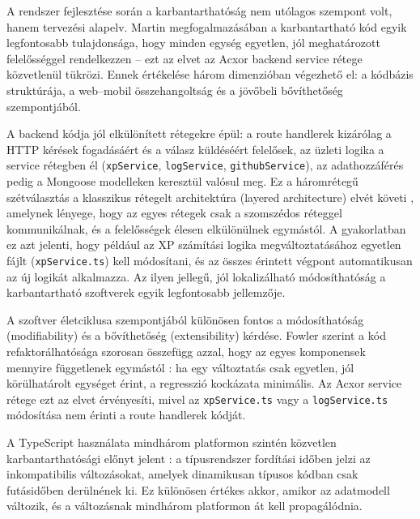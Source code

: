 
A rendszer fejlesztése során a karbantarthatóság nem utólagos szempont volt, hanem tervezési alapelv. Martin megfogalmazásában a karbantartható kód egyik legfontosabb tulajdonsága, hogy minden egység egyetlen, jól meghatározott felelősséggel rendelkezzen \cite{martin2008clean} -- ezt az elvet az Acxor backend service rétege közvetlenül tükrözi. Ennek értékelése három dimenzióban végezhető el: a kódbázis struktúrája, a web--mobil összehangoltság és a jövőbeli bővíthetőség szempontjából.


A backend kódja jól elkülönített rétegekre épül: a route handlerek kizárólag a HTTP kérések fogadásáért és a válasz küldéséért felelősek, az üzleti logika a service rétegben él (\texttt{xpService}, \texttt{logService}, \texttt{githubService}), az adathozzáférés pedig a Mongoose modelleken keresztül valósul meg. Ez a háromrétegű szétválasztás a klasszikus rétegelt architektúra (layered architecture) elvét követi \cite{gamma1994design}, amelynek lényege, hogy az egyes rétegek csak a szomszédos réteggel kommunikálnak, és a felelősségek élesen elkülönülnek egymástól. A gyakorlatban ez azt jelenti, hogy például az XP számítási logika megváltoztatásához egyetlen fájlt (\texttt{xpService.ts}) kell módosítani, és az összes érintett végpont automatikusan az új logikát alkalmazza. Az ilyen jellegű, jól lokalizálható módosíthatóság a karbantartható szoftverek egyik legfontosabb jellemzője.

A szoftver életciklusa szempontjából különösen fontos a módosíthatóság (modifiability) és a bővíthetőség (extensibility) kérdése. Fowler szerint a kód refaktorálhatósága szorosan összefügg azzal, hogy az egyes komponensek mennyire függetlenek egymástól \cite{fowler2018refactoring}: ha egy változtatás csak egyetlen, jól körülhatárolt egységet érint, a regresszió kockázata minimális. Az Acxor service rétege ezt az elvet érvényesíti, mivel az \texttt{xpService.ts} vagy a \texttt{logService.ts} módosítása nem érinti a route handlerek kódját.

A TypeScript használata mindhárom platformon szintén közvetlen karbantarthatósági előnyt jelent \cite{typescript}: a típusrendszer fordítási időben jelzi az inkompatibilis változásokat, amelyek dinamikusan típusos kódban csak futásidőben derülnének ki. Ez különösen értékes akkor, amikor az adatmodell változik, és a változásnak mindhárom platformon át kell propagálódnia.

